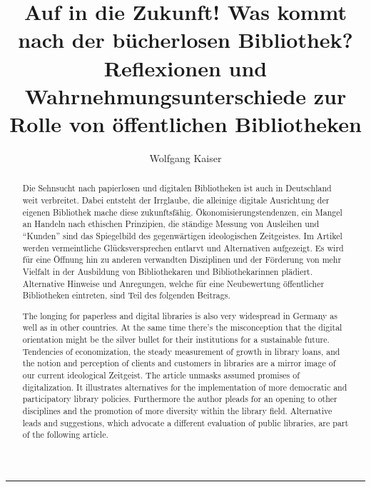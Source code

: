 \documentclass[a4paper,
fontsize=11pt,
oneside,
numbers=noperiodatend,
parskip=half-,
bibliography=totoc,
final
]{scrartcl}
\title{\LARGE{Auf in die Zukunft! Was kommt nach der bücherlosen Bibliothek? Reflexionen und Wahrnehmungsunterschiede zur Rolle von öffentlichen Bibliotheken}} %
\author{Wolfgang Kaiser} %
\date{}
\begin{document}
\maketitle
\thispagestyle{fancyplain} 

\begin{abstract}
\small
Die Sehnsucht nach papierlosen und digitalen Bibliotheken ist auch in
Deutschland weit verbreitet. Dabei entsteht der Irrglaube, die alleinige
digitale Ausrichtung der eigenen Bibliothek mache diese zukunftsfähig.
Ökonomisierungstendenzen, ein Mangel an Handeln nach ethischen
Prinzipien, die ständige Messung von Ausleihen und \enquote{Kunden} sind
das Spiegelbild des gegenwärtigen ideologischen Zeitgeistes. Im Artikel
werden vermeintliche Glücksversprechen entlarvt und Alternativen
aufgezeigt. Es wird für eine Öffnung hin zu anderen verwandten
Disziplinen und der Förderung von mehr Vielfalt in der Ausbildung von
Bibliothekaren und Bibliothekarinnen plädiert. Alternative Hinweise und
Anregungen, welche für eine Neubewertung öffentlicher Bibliotheken
eintreten, sind Teil des folgenden Beitrags.
\end{abstract}

\begin{abstract}
\small
The longing for paperless and digital libraries is also very widespread
in Germany as well as in other countries. At the same time there's the
misconception that the digital orientation might be the silver bullet
for their institutions for a sustainable future. Tendencies of
economization, the steady measurement of growth in library loans, and
the notion and perception of clients and customers in libraries are a
mirror image of our current ideological Zeitgeist. The article unmasks
assumed promises of digitalization. It illustrates alternatives for the
implementation of more democratic and participatory library policies.
Furthermore the author pleads for an opening to other disciplines and
the promotion of more diversity within the library field. Alternative
leads and suggestions, which advocate a different evaluation of public
libraries, are part of the following article.
\end{abstract}

\begin{center}\rule{3in}{0.4pt}\end{center}

\end{document}

